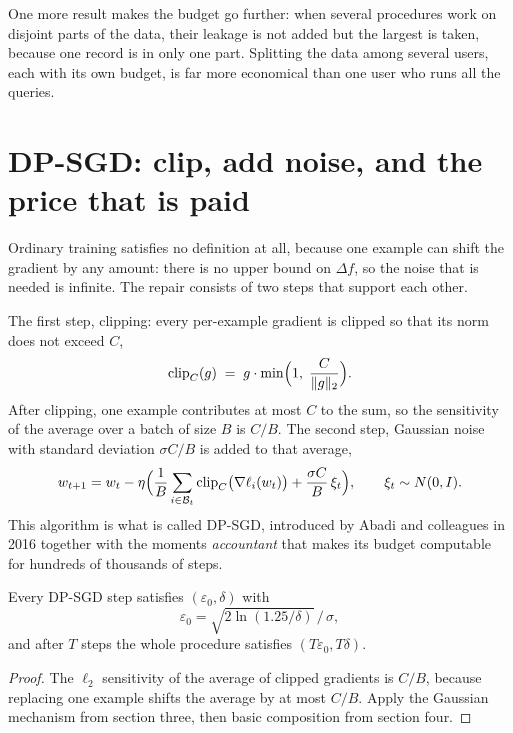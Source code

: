 One more result makes the budget go further: when several procedures work on disjoint
parts of the data, their leakage is not added but the largest is taken, because one
record is in only one part. Splitting the data among several users, each with its own
budget, is far more economical than one user who runs all the queries.


\section{DP-SGD: clip, add noise, and the price that is paid}

Ordinary training satisfies no definition at all, because one example can shift the
gradient by any amount: there is no upper bound on $\Delta f$, so the noise that is
needed is infinite. The repair consists of two steps that support each other.

The first step, clipping: every per-example gradient is clipped so that its norm does not
exceed $C$,
\begin{equation}
\operatorname{clip}_C(g) \;=\; g\cdot\min\Bigl(1,\;\frac{C}{\|g\|_2}\Bigr).
\end{equation}
After clipping, one example contributes at most $C$ to the sum, so the sensitivity of the
average over a batch of size $B$ is $C/B$. The second step, Gaussian noise with standard
deviation $\sigma C/B$ is added to that average,
\begin{equation}
w_{t+1} = w_t - \eta\Bigl(\frac{1}{B}\sum_{i\in\mathcal{B}_t}
\operatorname{clip}_C\bigl(\nabla\ell_i(w_t)\bigr) + \frac{\sigma C}{B}\,\xi_t\Bigr),
\qquad \xi_t\sim N(0,I).
\end{equation}
This algorithm is what is called DP-SGD, introduced by Abadi and colleagues in 2016
together with the moments \emph{accountant} that makes its budget computable for hundreds
of thousands of steps.

\begin{teorema}
Every DP-SGD step satisfies $(\varepsilon_0,\delta)$ with
\begin{equation}
\varepsilon_0=\sqrt{2\ln(1.25/\delta)}\,\big/\,\sigma ,
\end{equation}
and after $T$ steps the whole procedure satisfies $(T\varepsilon_0,T\delta)$.
\end{teorema}

\begin{proof}
The $\ell_2$ sensitivity of the average of clipped gradients is $C/B$, because replacing
one example shifts the average by at most $C/B$. Apply the Gaussian mechanism from
section three, then basic composition from section four.
\end{proof}

